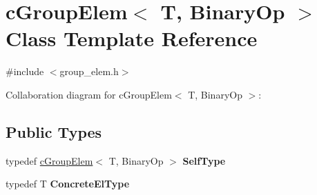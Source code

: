 \hypertarget{classcGroupElem}{\section{c\-Group\-Elem$<$ T, Binary\-Op $>$ Class Template Reference}
\label{classcGroupElem}
}


{\ttfamily \#include $<$group\-\_\-elem.\-h$>$}



Collaboration diagram for c\-Group\-Elem$<$ T, Binary\-Op $>$\-:
\subsection*{Public Types}
\begin{DoxyCompactItemize}
\item 
\hypertarget{classcGroupElem_a59d8e25f570c976b3c7f13756ada8dc4}{typedef \hyperlink{classcGroupElem}{c\-Group\-Elem}$<$ T, Binary\-Op $>$ {\bfseries Self\-Type}}\label{classcGroupElem_a59d8e25f570c976b3c7f13756ada8dc4}

\item 
\hypertarget{classcGroupElem_a49af5748a3d451f2256fb82266338bca}{typedef T {\bfseries Concrete\-El\-Type}}\label{classcGroupElem_a49af5748a3d451f2256fb82266338bca}

\end{DoxyCompactItemize}
